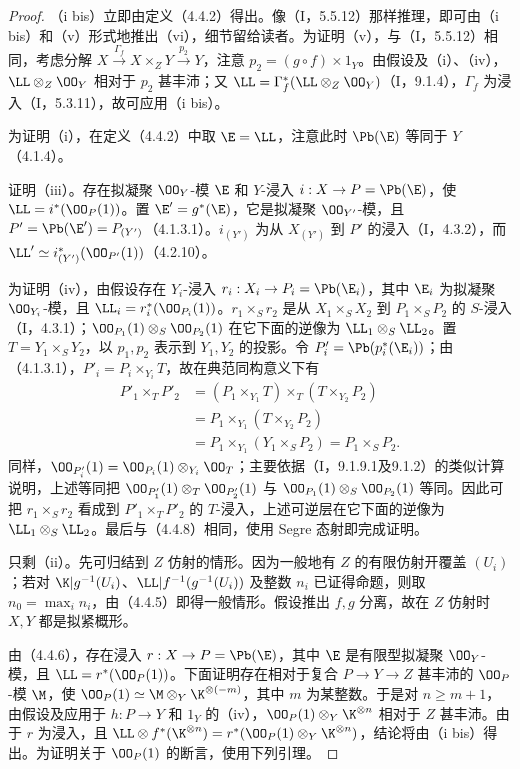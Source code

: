 \begin{proof}
（i bis）立即由定义（4.4.2）得出。像（I，5.5.12）那样推理，即可由（i bis）和（v）形式地推出（vi），细节留给读者。为证明（v），与（I，5.5.12）相同，考虑分解
$X\xrightarrow{\Gamma_f}X\times_Z Y\xrightarrow{p_2}Y$，注意 $p_2=(g\circ f)\times1_Y$。由假设及（i）、（iv），$\LL\otimes_Z\OO_Y$ 相对于 $p_2$ 甚丰沛；又 $\LL=\Gamma_f^*(\LL\otimes_Z\OO_Y)$（I，9.1.4），$\Gamma_f$ 为浸入（I，5.3.11），故可应用（i bis）。

为证明（i），在定义（4.4.2）中取 $\E=\LL$，注意此时 $\Pb(\E)$ 等同于 $Y$（4.1.4）。

证明（iii）。存在拟凝聚 $\OO_Y$-模 $\E$ 和 $Y$-浸入 $i:X\to P=\Pb(\E)$，使 $\LL=i^*(\OO_P(1))$。置 $\E'=g^*(\E)$，它是拟凝聚 $\OO_{Y'}$-模，且 $P'=\Pb(\E')=P_{(Y')}$（4.1.3.1）。$i_{(Y')}$ 为从 $X_{(Y')}$ 到 $P'$ 的浸入（I，4.3.2），而 $\LL'\simeq i_{(Y')}^*(\OO_{P'}(1))$（4.2.10）。

为证明（iv），由假设存在 $Y_i$-浸入 $r_i:X_i\to P_i=\Pb(\E_i)$，其中 $\E_i$ 为拟凝聚 $\OO_{Y_i}$-模，且 $\LL_i=r_i^*(\OO_{P_i}(1))$。$r_1\times_S r_2$ 是从 $X_1\times_S X_2$ 到 $P_1\times_S P_2$ 的 $S$-浸入（I，4.3.1）；$\OO_{P_1}(1)\otimes_S\OO_{P_2}(1)$ 在它下面的逆像为 $\LL_1\otimes_S\LL_2$。置 $T=Y_1\times_S Y_2$，以 $p_1,p_2$ 表示到 $Y_1,Y_2$ 的投影。令 $P'_i=\Pb(p_i^*(\E_i))$；由（4.1.3.1），$P'_i=P_i\times_{Y_i}T$，故在典范同构意义下有
\[
\begin{aligned}
P'_1\times_TP'_2
&=(P_1\times_{Y_1}T)\times_T(T\times_{Y_2}P_2)\\
&=P_1\times_{Y_1}(T\times_{Y_2}P_2)\\
&=P_1\times_{Y_1}(Y_1\times_S P_2)=P_1\times_S P_2.
\end{aligned}
\]
同样，$\OO_{P'_i}(1)=\OO_{P_i}(1)\otimes_{Y_i}\OO_T$；主要依据（I，9.1.9.1及9.1.2）的类似计算说明，上述等同把
$\OO_{P'_1}(1)\otimes_T\OO_{P'_2}(1)$ 与
$\OO_{P_1}(1)\otimes_S\OO_{P_2}(1)$ 等同。因此可把 $r_1\times_Sr_2$ 看成到 $P'_1\times_TP'_2$ 的 $T$-浸入，上述可逆层在它下面的逆像为 $\LL_1\otimes_S\LL_2$。最后与（4.4.8）相同，使用 Segre 态射即完成证明。

只剩（ii）。先可归结到 $Z$ 仿射的情形。因为一般地有 $Z$ 的有限仿射开覆盖 $(U_i)$；若对
$\K|g^{-1}(U_i)$、$\LL|f^{-1}(g^{-1}(U_i))$ 及整数 $n_i$ 已证得命题，则取 $n_0=\max_i n_i$，由（4.4.5）即得一般情形。假设推出 $f,g$ 分离，故在 $Z$ 仿射时 $X,Y$ 都是拟紧概形。

由（4.4.6），存在浸入 $r:X\to P=\Pb(\E)$，其中 $\E$ 是有限型拟凝聚 $\OO_Y$-模，且 $\LL=r^*(\OO_P(1))$。下面证明存在相对于复合 $P\to Y\to Z$ 甚丰沛的 $\OO_P$-模 $\M$，使 $\OO_P(1)\simeq\M\otimes_Y\K^{\otimes(-m)}$，其中 $m$ 为某整数。于是对 $n\geq m+1$，由假设及应用于 $h:P\to Y$ 和 $1_Y$ 的（iv），$\OO_P(1)\otimes_Y\K^{\otimes n}$ 相对于 $Z$ 甚丰沛。由于 $r$ 为浸入，且
$\LL\otimes f^*(\K^{\otimes n})=r^*(\OO_P(1)\otimes_Y\K^{\otimes n})$，结论将由（i bis）得出。为证明关于 $\OO_P(1)$ 的断言，使用下列引理。\renewcommand{\qedsymbol}{}
\end{proof}


